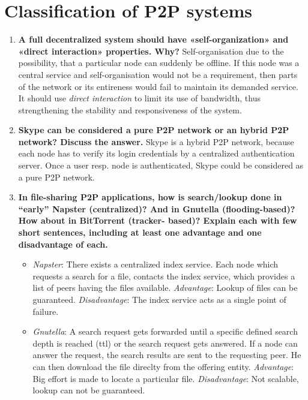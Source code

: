 \documentclass{article}
\begin{document}
\section{Classification of P2P systems}
  \begin{enumerate}[1]
    \item \textbf{A full decentralized system should have «self-organization» and «direct interaction» properties. Why?}
          Self-organisation due to the possibility, that a particular node can suddenly be offline. If this node was a central service 
          and self-organisation would not be a requirement, then parts of the network or its entireness would fail to maintain its demanded service. \\
          It should use \textit{direct interaction} to limit its use of bandwidth, thus strengthening the stability and responsiveness of the system.
    \item \textbf{Skype can be considered a pure P2P network or an hybrid P2P network? Discuss the answer.}
          Skype is a hybrid P2P network, because each node has to verify its login credentials by a centralized authentication server. 
          Once a user resp. node is authenticated, Skype could be considered as a pure P2P network.
    \item \textbf{In file-sharing P2P applications, how is search/lookup done in “early” Napster (centralized)? And in Gnutella (flooding-based)? How about in BitTorrent (tracker- based)? Explain each with few short sentences, including at least one advantage and one disadvantage of each.}
          \begin{itemize}
            \item \textit{Napster}: There exists a centralized index service. Each node which requests a search for a file, contacts the 
                  index service, which provides a list of peers having the files available. 
                  \textit{Advantage}: Lookup of files can be guaranteed. 
                  \textit{Disadvantage}: The index service acts as a single point of failure.
            \item \textit{Gnutella}: A search request gets forwarded until a specific defined search depth is reached (ttl) or the search request gets answered.
                  If a node can answer the request, the search results are sent to the requesting peer. He can then download the file direclty from the offering entity.
                  \textit{Advantage}: Big effort is made to locate a particular file.
                  \textit{Disadvantage}: Not scalable, lookup can not be guaranteed.

\end{itemize}
\end{enumerate}
\end{document}
